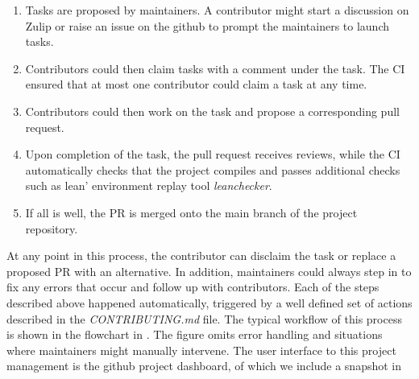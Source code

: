 \begin{enumerate}
    \item Tasks are proposed by maintainers. A contributor might start a discussion on Zulip or raise an issue on the github to prompt the maintainers to launch tasks.
    \item Contributors could then claim tasks with a comment under the task. The CI ensured that at most one contributor could claim a task at any time.
    \item Contributors could then work on the task and propose a corresponding pull request.
    \item Upon completion of the task, the pull request receives reviews, while the CI automatically checks that the project compiles and passes additional checks such as lean' environment replay tool \emph{leanchecker}.
    \item If all is well, the PR is merged onto the main branch of the project repository.
\end{enumerate}

At any point in this process, the contributor can disclaim the task or replace a proposed PR with an alternative. In addition, maintainers could always step in to fix any errors that occur and follow up with contributors. Each of the steps described above happened automatically, triggered by a well defined set of actions described in the \emph{CONTRIBUTING.md} file. The typical workflow of this process is shown in the flowchart in . The figure omits error handling and situations where maintainers might manually intervene. The user interface to this project management is the github project dashboard, of which we include a snapshot in 

